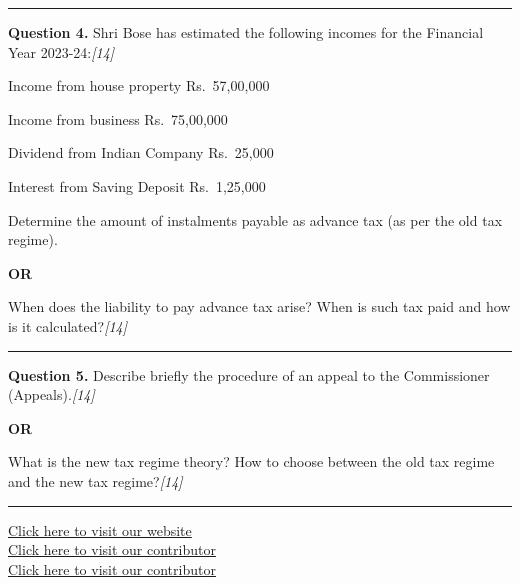 \documentclass[11pt,a4paper]{article}
\newcommand{\pts}[1]{\hfill   \textit{[#1]}}
\begin{document}
\medskip\rule{\linewidth}{0.2pt}




\noindent   \textbf{Question 4.}
Shri Bose has estimated the following incomes for the Financial Year 2023-24:\pts{14}

\begin{parts}
  \item Income from house property \hfill Rs.\ 57,00,000
  \item Income from business \hfill Rs.\ 75,00,000
  \item Dividend from Indian Company \hfill Rs.\ 25,000
  \item Interest from Saving Deposit \hfill Rs.\ 1,25,000
\end{parts}
Determine the amount of instalments payable as advance tax (as per the old tax regime).

\centerline{   \textbf{OR}}

When does the liability to pay advance tax arise? When is such tax paid and how is it calculated?\pts{14}

\medskip\rule{\linewidth}{0.2pt}




\noindent   \textbf{Question 5.}
Describe briefly the procedure of an appeal to the Commissioner (Appeals).\pts{14}

\centerline{   \textbf{OR}}

What is the new tax regime theory? How to choose between the old tax regime and the new tax regime?\pts{14}

\vfill
\rule{\linewidth}{0.4pt}

\begin{center}\small
\href{https://bhu-exam.vercel.app/}{Click here to visit our website}\\[4pt]
\href{https://me-aryan.vercel.app/}{Click here to visit our contributor}\\[4pt]
\href{https://quashan-me.vercel.app/}{Click here to visit our contributor}
\end{center}
\end{document}
